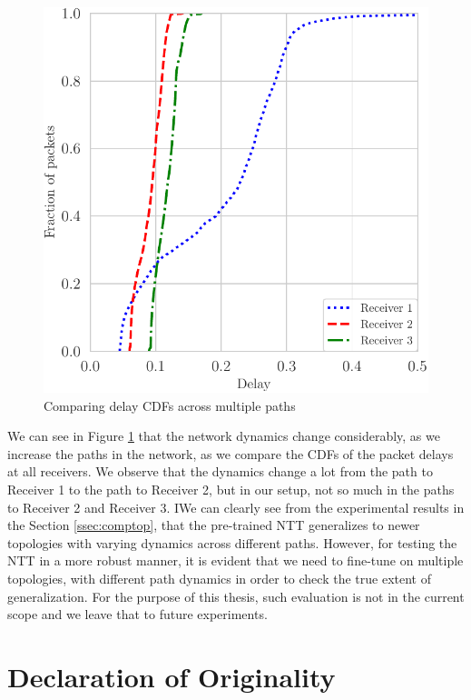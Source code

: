 \begin{figure}[!h]
  \begin{center}
    \includegraphics[scale=0.8]{figures/delay_Receivers.pdf}
    \caption{Comparing delay CDFs across multiple paths}
    \label{fig:multipatht}
  \end{center}
\end{figure}

We can see in Figure \ref{fig:multipatht} that the network dynamics change considerably, as we increase the paths in the network, as we compare the CDFs of the packet delays at all receivers. We observe that the dynamics change a lot from the path to Receiver 1 to the path to Receiver 2, but in our setup, not so much in the paths to Receiver 2 and Receiver 3. IWe can clearly see from the experimental results in the Section \ref{ssec:comptop}, that the pre-trained NTT generalizes to newer topologies with varying dynamics across different paths. However, for testing the NTT in a more robust manner, it is evident that we need to fine-tune on multiple topologies, with different path dynamics in order to check the true extent of generalization. For the purpose of this thesis, such evaluation is not in the current scope and we leave that to future experiments.

\chapter{Declaration of Originality}
\label{app:d}

